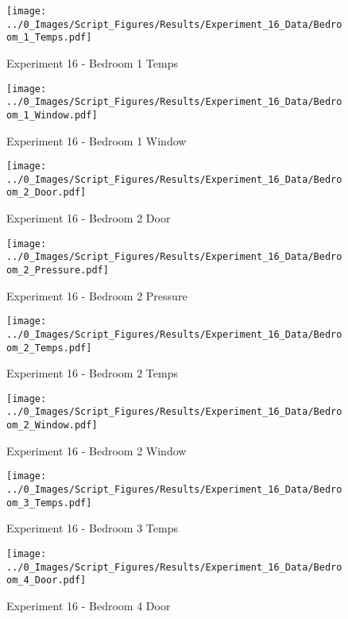 	\begin{figure}[H]
		\centering
		\texttt{[image: ../0\_Images/Script\_Figures/Results/Experiment\_16\_Data/Bedroom\_1\_Temps.pdf]}
		\caption[]{Experiment 16 - Bedroom 1 Temps}
	\end{figure}
 
	\clearpage

	\begin{figure}[H]
		\centering
		\texttt{[image: ../0\_Images/Script\_Figures/Results/Experiment\_16\_Data/Bedroom\_1\_Window.pdf]}
		\caption[]{Experiment 16 - Bedroom 1 Window}
	\end{figure}
 

	\begin{figure}[H]
		\centering
		\texttt{[image: ../0\_Images/Script\_Figures/Results/Experiment\_16\_Data/Bedroom\_2\_Door.pdf]}
		\caption[]{Experiment 16 - Bedroom 2 Door}
	\end{figure}
 
	\clearpage

	\begin{figure}[H]
		\centering
		\texttt{[image: ../0\_Images/Script\_Figures/Results/Experiment\_16\_Data/Bedroom\_2\_Pressure.pdf]}
		\caption[]{Experiment 16 - Bedroom 2 Pressure}
	\end{figure}
 

	\begin{figure}[H]
		\centering
		\texttt{[image: ../0\_Images/Script\_Figures/Results/Experiment\_16\_Data/Bedroom\_2\_Temps.pdf]}
		\caption[]{Experiment 16 - Bedroom 2 Temps}
	\end{figure}
 
	\clearpage

	\begin{figure}[H]
		\centering
		\texttt{[image: ../0\_Images/Script\_Figures/Results/Experiment\_16\_Data/Bedroom\_2\_Window.pdf]}
		\caption[]{Experiment 16 - Bedroom 2 Window}
	\end{figure}
 

	\begin{figure}[H]
		\centering
		\texttt{[image: ../0\_Images/Script\_Figures/Results/Experiment\_16\_Data/Bedroom\_3\_Temps.pdf]}
		\caption[]{Experiment 16 - Bedroom 3 Temps}
	\end{figure}
 
	\clearpage

	\begin{figure}[H]
		\centering
		\texttt{[image: ../0\_Images/Script\_Figures/Results/Experiment\_16\_Data/Bedroom\_4\_Door.pdf]}
		\caption[]{Experiment 16 - Bedroom 4 Door}
	\end{figure}
 


